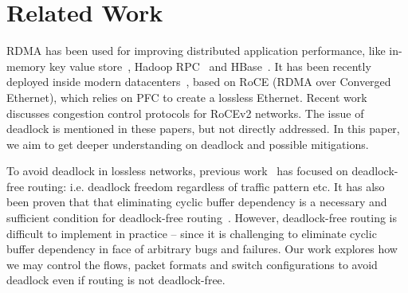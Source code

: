 \secspacelarge
\section{Related Work}
\secspace

 RDMA has been used for improving distributed
application performance, like in-memory key value store~\cite{mitchell13atc,
farm, kalia14sigcomm}, Hadoop RPC~\cite{hadooprdma} and HBase~\cite{hbaserdma}.
It has been recently deployed inside modern
datacenters~\cite{timely,dcqcn,rdmascale}, based on RoCE (RDMA over Converged
Ethernet), which relies on PFC to create a lossless Ethernet.  Recent
work~\cite{timely,dcqcn} discusses congestion control protocols for RoCEv2
networks. The issue of deadlock is mentioned in these papers, but not directly
addressed. In this paper, we aim to get deeper understanding on deadlock and
possible mitigations.

 To avoid deadlock in lossless networks, previous
work~\cite{tcpbolt,karol2003prevention,lash,sancho2004,wu2003fault} has focused
on deadlock-free routing: i.e. deadlock freedom regardless of traffic pattern
etc. It has also been proven that that eliminating cyclic buffer dependency is a
necessary and sufficient condition for deadlock-free
routing~\cite{deadlockfree}. However, deadlock-free routing is difficult to
implement in practice -- since it is challenging to eliminate cyclic buffer
dependency in face of arbitrary bugs and failures. Our work explores how we may
control the flows, packet formats and switch configurations to avoid deadlock
even if routing is not deadlock-free.






